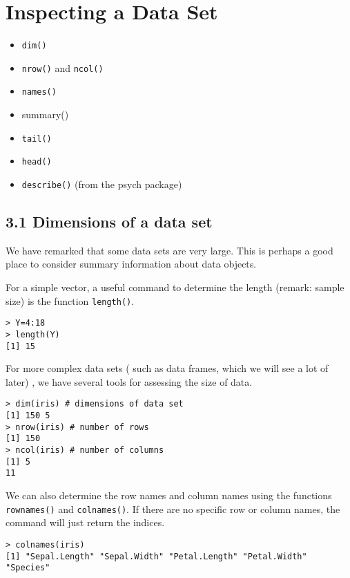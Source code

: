 \documentclass[a4paper,12pt]{article}
\begin{document}

\section{Inspecting a Data Set}
\begin{itemize}
	\item \texttt{dim()}
	\item \texttt{nrow()} and \texttt{ncol()}
	\item \texttt{names()}
	\item summary()
	\item \texttt{tail()}
	\item \texttt{head()}
	\item \texttt{describe()} (from the psych package)
\end{itemize}
\subsection*{3.1 Dimensions of a data set}
We have remarked that some data sets are very large. This is perhaps a good place to consider
summary information about data objects. 

For a simple vector, a useful command to determine
the length (remark: sample size) is the function \texttt{length()}.
\begin{framed}
\begin{verbatim}
> Y=4:18
> length(Y)
[1] 15
\end{verbatim}
\end{framed}
For more complex data sets ( such as data frames,  which we will see a lot of later) , we have several
tools for assessing the size of data.
\begin{framed}
\begin{verbatim}
> dim(iris) # dimensions of data set
[1] 150 5
> nrow(iris) # number of rows
[1] 150
> ncol(iris) # number of columns
[1] 5
11

\end{verbatim}
\end{framed}

We can also determine the row names and column names using the functions \texttt{row\texttt{names()}}
and \texttt{colnames()}. If there are no specific row or column names, the command will just return
the indices.
\begin{framed}
\begin{verbatim}
> colnames(iris)
[1] "Sepal.Length" "Sepal.Width" "Petal.Length" "Petal.Width" "Species"

\end{verbatim}
\end{framed}
\end{document}
